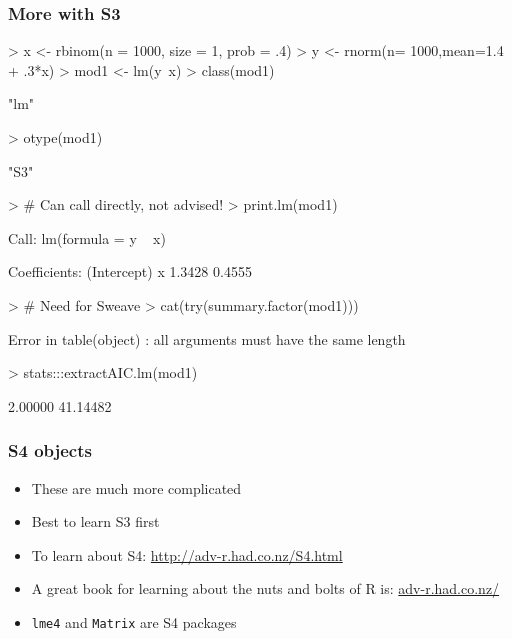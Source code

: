 \documentclass[xcolor=svgnames]{beamer}
\begin{document}
\begin{frame}[fragile]
  \frametitle{More with S3}
\begin{tiny}
\begin{Schunk}
\begin{Sinput}
> x <- rbinom(n = 1000, size = 1, prob = .4)
> y <- rnorm(n= 1000,mean=1.4 + .3*x)
> mod1 <- lm(y~x)
> class(mod1)
\end{Sinput}
\begin{Soutput}
[1] "lm"
\end{Soutput}
\begin{Sinput}
> otype(mod1)
\end{Sinput}
\begin{Soutput}
[1] "S3"
\end{Soutput}
\begin{Sinput}
> # Can call directly, not advised!
> print.lm(mod1)
\end{Sinput}
\begin{Soutput}
Call:
lm(formula = y ~ x)

Coefficients:
(Intercept)            x  
     1.3428       0.4555  
\end{Soutput}
\begin{Sinput}
> # Need for Sweave
> cat(try(summary.factor(mod1)))
\end{Sinput}
\begin{Soutput}
Error in table(object) : all arguments must have the same length
\end{Soutput}
\begin{Sinput}
> stats:::extractAIC.lm(mod1)
\end{Sinput}
\begin{Soutput}
[1]  2.00000 41.14482
\end{Soutput}
\end{Schunk}
\end{tiny}
\end{frame}

\begin{frame}
  \frametitle{S4 objects}
  \begin{itemize}
    \item These are much more complicated
      \item Best to learn S3 first
        \item To learn about S4: \url{http://adv-r.had.co.nz/S4.html}
          \item A great book for learning about the nuts and bolts of R is: \url{adv-r.had.co.nz/}
            \item \texttt{lme4} and \texttt{Matrix} are S4 packages
      
  \end{itemize}
\end{frame}
\end{document}
